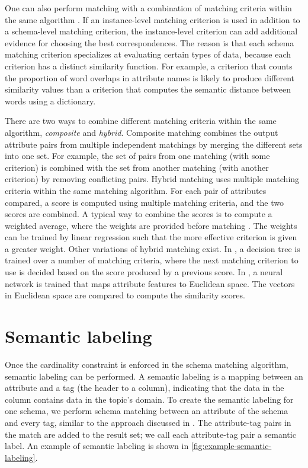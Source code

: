 One can also perform matching with a combination of matching criteria within the same algorithm \cite{Sorrentino2011NORMS}. If an instance-level matching criterion is used in addition to a schema-level matching criterion, the instance-level criterion can add additional evidence for choosing the best correspondences. The reason is that each schema matching criterion specializes at evaluating certain types of data, because each criterion has a distinct similarity function. For example, a criterion that counts the proportion of word overlaps in attribute names is likely to produce different similarity values than a criterion that computes the semantic distance between words using a dictionary.

There are two ways to combine different matching criteria within the same algorithm, \textit{composite} and \textit{hybrid}. Composite matching combines the output attribute pairs from multiple independent matchings by merging the different sets into one set. For example, the set of pairs from one matching (with some criterion) is combined with the set from another matching (with another criterion) by removing conflicting pairs. Hybrid matching uses multiple matching criteria within the same matching algorithm. For each pair of attributes compared, a score is computed using multiple matching criteria, and the two scores are combined. A typical way to combine the scores is to compute a weighted average, where the weights are provided before matching \cite{DBLP:journals/debu/ChenGHTD18}. The weights can be trained by linear regression \cite{Ehrig2004QOM} such that the more effective criterion is given a greater weight. Other variations of hybrid matching exist. In \cite{Giunchiglia2005Semantic}, a decision tree is trained over a number of matching criteria, where the next matching criterion to use is decided based on the score produced by a previous score. In \cite{Moawed2018Arabian}, a neural network is trained that maps attribute features to Euclidean space. The vectors in Euclidean space are compared to compute the similarity scores.

\section{Semantic labeling}
\label{sec:SemanticLabeling}

Once the cardinality constraint is enforced in the schema matching algorithm, semantic labeling can be performed. A semantic labeling is a mapping between an attribute and a tag (the header to a column), indicating that the data in the column contains data in the topic's domain. To create the semantic labeling for one schema, we perform schema matching between an attribute of the schema and every tag, similar to the approach discussed in \cite{Dong2012Proceedings,Salakhutdinov2009Semantic}. The attribute-tag pairs in the match are added to the result set; we call each attribute-tag pair a semantic label. An example of semantic labeling is shown in \autoref{fig:example-semantic-labeling}.

